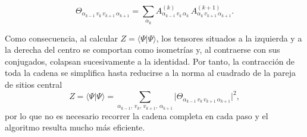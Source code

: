 \documentclass[12pt]{extarticle}
\numberwithin{equation}{section}
\begin{document}
\begin{refsection}
\begin{equation}
    \Theta_{\alpha_{k-1}\, v_k\, v_{k+1}\, \alpha_{k+1}}
    = \sum_{\alpha_k}
      A^{(k)}_{\alpha_{k-1}\, v_k\, \alpha_k}\,
      A^{(k+1)}_{\alpha_k\, v_{k+1}\, \alpha_{k+1}} .
    \label{eq:merged}
\end{equation}

Como consecuencia, al calcular $Z = \langle \Psi | \Psi \rangle$, los tensores situados a la izquierda y a la derecha del centro se comportan como isometrías y, al contraerse con sus conjugados, colapsan sucesivamente a la identidad. Por tanto, la contracción de toda la cadena se simplifica hasta reducirse a la norma al cuadrado de la pareja de sitios central
\begin{equation}
    Z = \langle \Psi | \Psi \rangle
      = \sum_{\alpha_{k-1},\, v_k,\, v_{k+1},\, \alpha_{k+1}}
        \bigl| \Theta_{\alpha_{k-1}\, v_k\, v_{k+1}\, \alpha_{k+1}} \bigr|^2 ,
    \label{eq:znorm}
\end{equation}
por lo que no es necesario recorrer la cadena completa en cada paso y el algoritmo resulta mucho más eficiente.


\end{refsection}
\end{document}

